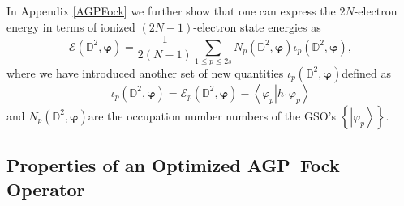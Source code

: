 \documentclass[aps,preprint]{revtex4}%
\begin{document}
In Appendix \ref{AGPFock} we further show that one can express the
$2N$-electron energy in terms of ionized $\left(  2N-1\right)  $-electron
state energies as
\begin{equation}
\mathcal{E}\left(  \mathbb{D}^{2},\bm{\varphi}\right)  =\frac{1}{2\left(
N-1\right)  }\sum_{1\leq p\leq2s}N_{p}\left(  \mathbb{D}^{2}%
,\bm{\varphi }\right)  \iota_{p}\left(  \mathbb{D}^{2},\bm{\varphi}\right)  ,
\end{equation}
where we have introduced another set of new quantities $\iota_{p}\left(
\mathbb{D}^{2},\bm{\varphi}\right)  $defined as
\begin{equation}
\iota_{p}\left(  \mathbb{D}^{2},\bm{\varphi}\right)  =\mathcal{E}_{p}\left(
\mathbb{D}^{2},\bm{\varphi}\right)  -\left\langle \left.  \varphi
_{p}\right\vert h_{1}\varphi_{p}\right\rangle
\end{equation}
and $N_{p}\left(  \mathbb{D}^{2},\bm{\varphi }\right)  $are the occupation
number numbers of the GSO's $\left\{  \left\vert \varphi_{p}\right\rangle
\right\}  $.

\subsection{Properties of an Optimized AGP\ Fock Operator\label{AGP_Fock}}
\end{document}
